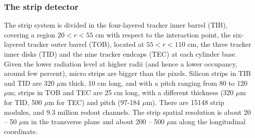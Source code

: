\subsubsection{The strip detector}
The strip system is divided in the four-layered tracker inner barrel (TIB), covering a region $20 < r < 55$ cm with respect to the interaction point, the six-layered tracker outer barrel (TOB), located at $55 < r < 110$ cm, the three tracker inner disks (TID) and the nine tracker endcaps (TEC) at each cylinder base. Given the lower radiation level at higher radii (and hence a lower occupancy, around few percent), micro strips are bigger than the pixels. Silicon strips in TIB and TID are 320 $\mu$m thick, 10 cm long, and with a pitch ranging from 80 to 120 $\mu$m; strips in TOB and TEC are 25 cm long, with a different thickness (320 $\mu$m for TID, 500 $\mu$m for TEC) and pitch (97-184 $\mu$m). There are 15148 strip modules, and 9.3 million redout channels. The strip spatial resolution is about 20 -- 50 $\mu$m in the transverse plane and about 200 -- 500 $\mu$m along the longitudinal coordinate.

